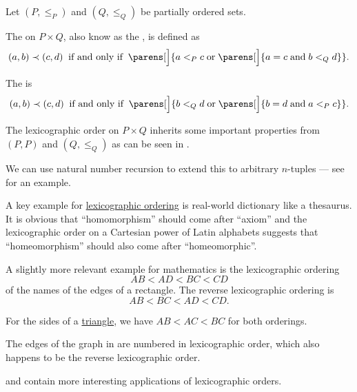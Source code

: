 \begin{definition}\label{def:lexicographic_order}
  Let \( (P, \leq_P) \) and \( (Q, \leq_Q) \) be partially ordered sets.

  The  on \( P \times Q \), also know as the , is defined as
  \begin{equation}\label{eq:def:lexicographic_order}
    (a, b) \prec (c, d) \thickspace \T{if and only if} \thickspace \parens[\Big]{ a <_P c \T{or} \parens[\Big]{ a = c \T{and} b <_Q d } }.
  \end{equation}

  The  is
  \begin{equation}\label{eq:def:lexicographic_order/reverse}
    (a, b) \prec (c, d) \thickspace \T{if and only if} \thickspace \parens[\Big]{ b <_Q d \T{or} \parens[\Big]{ b = d \T{and} a <_P c } }.
  \end{equation}

  The lexicographic order on \( P \times Q \) inherits some important properties from \( (P, P) \) and \( (Q, \leq_Q) \) as can be seen in .

  We can use natural number recursion to extend this to arbitrary \( n \)-tuples --- see  for an example.
\end{definition}

\begin{example}\label{ex:def:lexicographic_order}
  A key example for \hyperref[def:lexicographic_order]{lexicographic ordering} is real-world dictionary like a thesaurus. It is obvious that \enquote{homomorphism} should come after \enquote{axiom} and the lexicographic order on a Cartesian power of Latin alphabets suggests that \enquote{homeomorphism} should also come after \enquote{homeomorphic}.

  A slightly more relevant example for mathematics is the lexicographic ordering
  \begin{equation*}
    AB < AD < BC < CD
  \end{equation*}
  of the names of the edges of a rectangle. The reverse lexicographic ordering is
  \begin{equation*}
    AB < BC < AD < CD.
  \end{equation*}

  For the sides of a \hyperref[def:triangle]{triangle}, we have \( AB < AC < BC \) for both orderings.

  The edges of the graph in  are numbered in lexicographic order, which also happens to be the reverse lexicographic order.

   and  contain more interesting applications of lexicographic orders.
\end{example}

